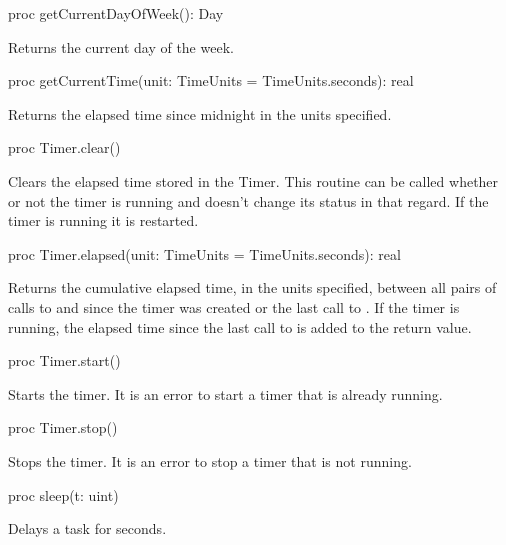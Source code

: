 \begin{protohead}
proc getCurrentDayOfWeek(): Day
\end{protohead}
\begin{protobody}
Returns the current day of the week.
\end{protobody}

\begin{protohead}
proc getCurrentTime(unit: TimeUnits = TimeUnits.seconds): real
\end{protohead}
\begin{protobody}
Returns the elapsed time since midnight in the units specified.
\end{protobody}

\begin{protohead}
proc Timer.clear()
\end{protohead}
\begin{protobody}
Clears the elapsed time stored in the Timer.  This routine can be called
whether or not the timer is running and doesn't change its status in that
regard.  If the timer is running it is restarted.
\end{protobody}

\begin{protohead}
proc Timer.elapsed(unit: TimeUnits = TimeUnits.seconds): real
\end{protohead}
\begin{protobody}
Returns the cumulative elapsed time, in the units specified, between
all pairs of calls to  and  since the timer was
created or the last call to .  If the timer is running,
the elapsed time since the last call to  is added to the
return value.
\end{protobody}

\begin{protohead}
proc Timer.start()
\end{protohead}
\begin{protobody}
Starts the timer.  It is an error to start a timer that is already
running.
\end{protobody}

\begin{protohead}
proc Timer.stop()
\end{protohead}
\begin{protobody}
Stops the timer.  It is an error to stop a timer that is not running.
\end{protobody}

\begin{protohead}
proc sleep(t: uint)
\end{protohead}
\begin{protobody}
Delays a task for  seconds.
\end{protobody}


